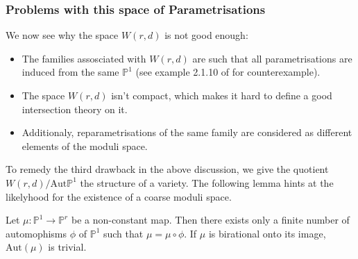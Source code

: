 \subsubsection{Problems with this space of Parametrisations}
We now see why the space $W(r,d)$ is not good enough:
\begin{itemize}
    \item The families assosciated with $W(r,d)$ are such that all parametrisations are induced from the same $\mathbb{P}^{1}$ (see example 2.1.10 of \cite{KockQcohom} for counterexample).
    \item The space $W(r,d)$ isn't compact, which makes it hard to define a good intersection theory on it.
    \item Additionaly, reparametrisations of the same family are considered as different elements of the moduli space.
\end{itemize}

\par To remedy the third drawback in the above discussion, we give the quotient $W(r,d)/\text{Aut}\mathbb{P}^{1}$ the structure of a variety.
The following lemma hints at the likelyhood for the existence of a coarse moduli space.

\begin{lemma}
    Let $\mu : \mathbb{P}^{1} \to \mathbb{P}^{r}$ be a non-constant map. 
    Then there exists only a finite number of automophisms $\phi$ of $\mathbb{P}^{1}$ such that $\mu = \mu \circ \phi$.
    If $\mu$ is birational onto its image, $\text{Aut}(\mu)$ is trivial.
\end{lemma}


